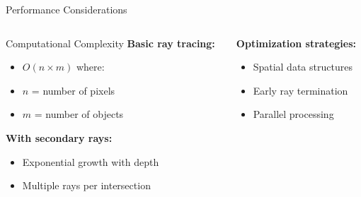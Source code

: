 \begin{frame}{Performance Considerations}
    \begin{columns}
        \begin{column}{0.5\textwidth}
            \begin{raybox}{Computational Complexity}
                \textbf{Basic ray tracing:}
                \begin{itemize}
                    \item $O(n \times m)$ where:
                    \item $n$ = number of pixels
                    \item $m$ = number of objects
                \end{itemize}
                
                \vspace{0.3cm}
                \textbf{With secondary rays:}
                \begin{itemize}
                    \item Exponential growth with depth
                    \item Multiple rays per intersection
                \end{itemize}
            \end{raybox}
        \end{column}
        \begin{column}{0.5\textwidth}
            
            \vspace{0.3cm}
            \textbf{Optimization strategies:}
            \begin{itemize}
                \item Spatial data structures
                \item Early ray termination
                \item Parallel processing
            \end{itemize}
        \end{column}
    \end{columns}
\end{frame}

